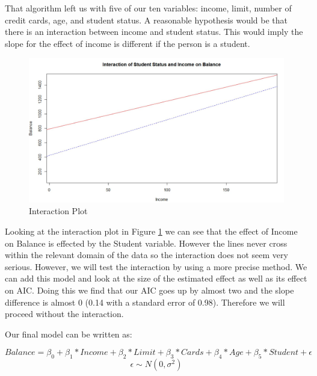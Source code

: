 \documentclass{article}
\begin{document}
That algorithm left us with five of our ten variables: income, limit, number of credit cards, age, and student status. A reasonable hypothesis would be that there is an interaction between income and student status. This would imply the slope for the effect of income is different if the person is a student. 

\begin{figure}
\centering
\includegraphics[scale=.6]{interaction.JPG}
\caption{Interaction Plot}
\label{interaction}
\end{figure}

Looking at the interaction plot in Figure \ref{interaction} we can see that the effect of Income on Balance is effected by the Student variable. However the lines never cross within the relevant domain of the data so the interaction does not seem very serious. However, we will test the interaction by using a more precise method. We can add this model and look at the size of the estimated effect as well as its effect on AIC. Doing this we find that our AIC goes up by almost two and the slope difference is almost 0 (0.14 with a standard error of 0.98). Therefore we will proceed without the interaction.

Our final model can be written as:

\begin{equation}
Balance = \beta_0+ \beta_1 * Income + \beta_2 * Limit + \beta_3 * Cards + \beta_4 * Age +\beta_5*Student +\epsilon
\end{equation}
$$\epsilon \sim N(0, \sigma^2)
$$          
\end{document}
